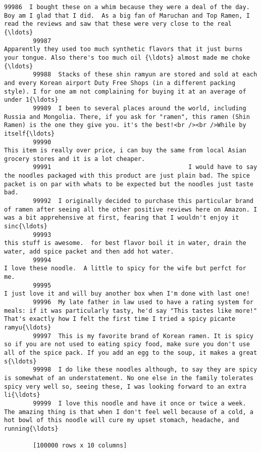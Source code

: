 \documentclass[11pt]{article}
\begin{document}
\begin{Verbatim}[commandchars=\\\{\}]
        99986  I bought these on a whim because they were a deal of the day.  Boy am I glad that I did.  As a big fan of Maruchan and Top Ramen, I read the reviews and saw that these were very close to the real {\ldots}  
        99987                                                                   Apparently they used too much synthetic flavors that it just burns your tongue. Also there's too much oil {\ldots} almost made me choke {\ldots}  
        99988  Stacks of these shin ramyun are stored and sold at each and every Korean airport Duty Free Shops (in a different packing style). I for one am not complaining for buying it at an average of under 1{\ldots}  
        99989  I been to several places around the world, including Russia and Mongolia. There, if you ask for "ramen", this ramen (Shin Ramen) is the one they give you. it's the best!<br /><br />While by itself{\ldots}  
        99990                                                                                              This item is really over price, i can buy the same from local Asian grocery stores and it is a lot cheaper.  
        99991                                      I would have to say the noodles packaged with this product are just plain bad. The spice packet is on par with whats to be expected but the noodles just taste bad.  
        99992  I originally decided to purchase this particular brand of ramen after seeing all the other positive reviews here on Amazon. I was a bit apprehensive at first, fearing that I wouldn't enjoy it sinc{\ldots}  
        99993                                                                                      this stuff is awesome.  for best flavor boil it in water, drain the water, add spice packet and then add hot water.  
        99994                                                                                                                                  I love these noodle.  A little to spicy for the wife but perfct for me.  
        99995                                                                                                                                     I just love it and will buy another box when I'm done with last one!  
        99996  My late father in law used to have a rating system for meals: if it was particularly tasty, he'd say "This tastes like more!" That's exactly how I felt the first time I tried a spicy picante ramyu{\ldots}  
        99997  This is my favorite brand of Korean ramen. It is spicy so if you are not used to eating spicy food, make sure you don't use all of the spice pack. If you add an egg to the soup, it makes a great s{\ldots}  
        99998  I do like these noodles although, to say they are spicy is somewhat of an understatement. No one else in the family tolerates spicy very well so, seeing these, I was looking forward to an extra li{\ldots}  
        99999  I love this noodle and have it once or twice a week. The amazing thing is that when I don't feel well because of a cold, a hot bowl of this noodle will cure my upset stomach, headache, and running{\ldots}  
        
        [100000 rows x 10 columns]
\end{Verbatim}
            
\end{document}
